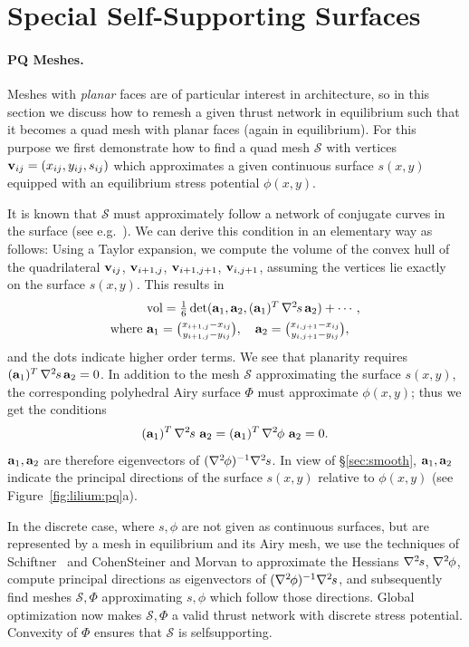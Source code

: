 \documentclass[annual]{acmsiggraph}
\def\ess{s}
\def\Hess#1{{\def\testess{#1}\nabla^2\ifx\testess\ess\!s\else #1\fi}}
\def\Hess#1{\text{$\nabla^2\hskip-.2ex #1$}}
\def\SS{{\mathcal S}}
\begin{document}
\section{Special Self-Supporting Surfaces} \label{sec:special}

\paragraph{PQ Meshes.}

Meshes with {\em planar} faces are of particular interest in architecture, 
so in this section we discuss how to remesh a given thrust network in 
equilibrium such that it becomes a quad mesh with planar faces (again in 
equilibrium). For this purpose we first demonstrate how to find a quad 
mesh $\SS$ with vertices ${\mathbf v}_{ij}=(x_{ij},y_{ij},s_{ij})$ which 
approximates a given continuous surface $s(x,y)$ equipped with an 
equilibrium stress potential $\phi(x,y)$.

It is known that $\SS$ must approximately follow a network of conjugate
curves in the surface (see e.g.\ \cite{Liu2006}). We can derive this
condition in an elementary way as follows: Using a Taylor expansion, we
compute the volume of the convex hull of the quadrilateral ${\mathbf v}_{ij}$,
${\mathbf v}_{i+1,j}$, ${\mathbf v}_{i+1,j+1}$, ${\mathbf v}_{i,j+1}$, assuming the vertices lie
exactly on the surface $s(x,y)$. This results in
	\begin{align*}
	&\textstyle
	\text{vol} =
	{1\over 6}\det(\aw_1,\aw_2,(\aw_1)^T\,\Hess s\,\aw_2) + \cdots,
	\\
	\text{where}\
	& \textstyle
	\aw_1={x_{i+1,j}-x_{ij}\choose y_{i+1,j}-y_{ij}},\quad
	\aw_2={x_{i,j+1}-x_{ij}\choose y_{i,j+1}-y_{ij}},
	\end{align*}
 and the dots indicate higher order terms. We see that planarity requires
$(\aw_1)^T\,\Hess s\,\aw_2=0$. In addition to the mesh $\SS$ approximating the surface $s(x,y)$, the corresponding polyhedral
Airy surface $\Phi$ must approximate $\phi(x,y)$; thus we get the conditions
	$$
	(\aw_1)^T\,\Hess s\,\,\aw_2=
	(\aw_1)^T\,\Hess \phi\,\,\aw_2= 0.
	$$
 ${\mathbf a}_1,{\mathbf a}_2$ are therefore eigenvectors of $(\Hess\phi)^{-1}\Hess s$. In view
of \S\ref{sec:smooth}, ${\mathbf a}_1,{\mathbf a}_2$ indicate the principal directions of
the surface $s(x,y)$ relative to $\phi(x,y)$ (see
Figure~\ref{fig:lilium:pq}a).

In the discrete case, where $s,\phi$ are not given as continuous surfaces,
but are represented by a mesh in equilibrium and its Airy mesh, we use the
techniques of Schiftner~\shortcite{Schiftner2007} and Cohen\dash Steiner
and Morvan \shortcite{Cohen-Steiner2003} to approximate the Hessians
$\Hess s$, $\Hess\phi$, compute principal directions as eigenvectors of
$(\Hess\phi)^{-1}\Hess s$, and subsequently find meshes $\SS,\Phi$
approximating $s,\phi$ which follow those directions. Global
optimization now makes $\SS,\Phi$ a valid thrust network with discrete stress
potential. Convexity of $\Phi$ ensures that $\SS$ is self\dash supporting.
\end{document}
